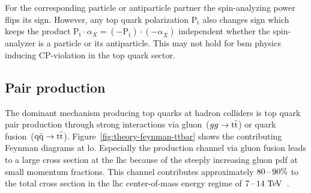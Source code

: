 For the corresponding particle or antiparticle partner the spin-analyzing power flips its sign. However, any top quark polarization $\mathrm{P}_\mathrm{t}$ also changes sign which keeps the product $\mathrm{P}_\mathrm{t}\cdot\alpha_{X}=(-\mathrm{P}_{\bar{\mathrm{t}}})\cdot(-\alpha_{\bar{X}})$ independent whether the spin-analyzer is a particle or its antiparticle. This may not hold for \gls{bsm} physics inducing CP-violation in the top quark sector.


\subsection{Pair production}

The dominant mechanism producing top quarks at hadron colliders is top quark pair production through strong interactions via gluon~($gg\to\mathrm{t}\bar{\mathrm{t}}$) or quark fusion~($\mathrm{q}\bar{\mathrm{q}}\to\mathrm{t}\bar{\mathrm{t}}$). Figure~\ref{fig:theory-feynman-ttbar} shows the contributing Feynman diagrams at \gls{lo}. Especially the production channel via gluon fusion leads to a large cross section at the \gls{lhc} because of the steeply increasing gluon \gls{pdf} at small momentum fractions. This channel contributes approximately $80\,\text{--}\,90\%$ to the total cross section in the \gls{lhc} center-of-mass energy regime of $7\,\text{--}\,14~\mathrm{TeV}$~\cite{Olive:2016xmw}.

